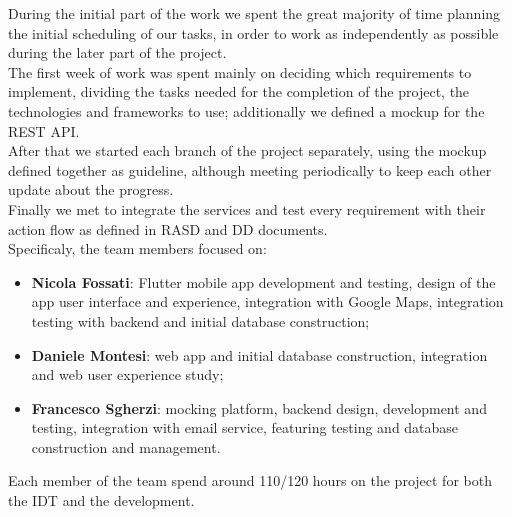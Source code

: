     During the initial part of the work we spent the great majority of time planning the initial scheduling of our tasks, in order to work as independently as possible during the later part of the project.\\
    
    \noindent The first week of work was spent mainly on deciding which requirements to implement, dividing the tasks needed for the completion of the project, the technologies and frameworks to use; additionally we defined a mockup for the REST API.\\
    
    \noindent After that we started each branch of the project separately, using the mockup defined together as guideline, although meeting periodically to keep each other update about the progress.\\
    
    \noindent Finally we met to integrate the services and test every requirement with their action flow as defined in RASD and DD documents.\\
    
    \noindent Specificaly, the team members focused on:
    \begin{itemize}
        \item \textbf{Nicola Fossati}: Flutter mobile app development and testing, design of the app user interface and experience, integration with Google Maps, integration testing with backend and initial database construction;
        \item \textbf{Daniele Montesi}: web app and initial database construction, integration and web user experience study;
        \item \textbf{Francesco Sgherzi}: mocking platform, backend design, development and testing, integration with email service, featuring testing and database construction and management.
    \end{itemize}
    
    \noindent Each member of the team spend around 110/120 hours on the project for both the IDT and the development.